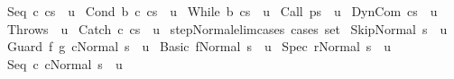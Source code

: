 \begin{isabellebody}
\ {\isachardoublequoteopen}{\isasymGamma}{\isasymturnstile}{\isacharparenleft}Seq\ c{}\ c{}{\isacharcomma}s{\isacharparenright}\ {\isasymrightarrow}\ u{\isachardoublequoteclose}\isanewline
\ {\isachardoublequoteopen}{\isasymGamma}{\isasymturnstile}{\isacharparenleft}Cond\ b\ c{}\ c{}{\isacharcomma}s{\isacharparenright}\ {\isasymrightarrow}\ u{\isachardoublequoteclose}\isanewline
\ {\isachardoublequoteopen}{\isasymGamma}{\isasymturnstile}{\isacharparenleft}While\ b\ c{\isacharcomma}s{\isacharparenright}\ {\isasymrightarrow}\ u{\isachardoublequoteclose}\isanewline
\ {\isachardoublequoteopen}{\isasymGamma}{\isasymturnstile}{\isacharparenleft}Call\ p{\isacharcomma}s{\isacharparenright}\ {\isasymrightarrow}\ u{\isachardoublequoteclose}\isanewline
\ {\isachardoublequoteopen}{\isasymGamma}{\isasymturnstile}{\isacharparenleft}DynCom\ c{\isacharcomma}s{\isacharparenright}\ {\isasymrightarrow}\ u{\isachardoublequoteclose}\isanewline
\ {\isachardoublequoteopen}{\isasymGamma}{\isasymturnstile}{\isacharparenleft}Throw{\isacharcomma}s{\isacharparenright}\ {\isasymrightarrow}\ u{\isachardoublequoteclose}\isanewline
\ {\isachardoublequoteopen}{\isasymGamma}{\isasymturnstile}{\isacharparenleft}Catch\ c{}\ c{}{\isacharcomma}s{\isacharparenright}\ {\isasymrightarrow}\ u{\isachardoublequoteclose}\isanewline
\isanewline
{}\isamarkupfalse%
\ step{\isacharunderscore}Normal{\isacharunderscore}elim{\isacharunderscore}cases\ {\isacharbrackleft}cases\ set{\isacharbrackright}{\isacharcolon}\isanewline
\ {\isachardoublequoteopen}{\isasymGamma}{\isasymturnstile}{\isacharparenleft}Skip{\isacharcomma}Normal\ s{\isacharparenright}\ {\isasymrightarrow}\ u{\isachardoublequoteclose}\isanewline
\ {\isachardoublequoteopen}{\isasymGamma}{\isasymturnstile}{\isacharparenleft}Guard\ f\ g\ c{\isacharcomma}Normal\ s{\isacharparenright}\ {\isasymrightarrow}\ u{\isachardoublequoteclose}\isanewline
\ {\isachardoublequoteopen}{\isasymGamma}{\isasymturnstile}{\isacharparenleft}Basic\ f{\isacharcomma}Normal\ s{\isacharparenright}\ {\isasymrightarrow}\ u{\isachardoublequoteclose}\isanewline
\ {\isachardoublequoteopen}{\isasymGamma}{\isasymturnstile}{\isacharparenleft}Spec\ r{\isacharcomma}Normal\ s{\isacharparenright}\ {\isasymrightarrow}\ u{\isachardoublequoteclose}\isanewline
\ {\isachardoublequoteopen}{\isasymGamma}{\isasymturnstile}{\isacharparenleft}Seq\ c{}\ c{}{\isacharcomma}Normal\ s{\isacharparenright}\ {\isasymrightarrow}\ u{\isachardoublequoteclose}\isanewline

\end{isabellebody}
